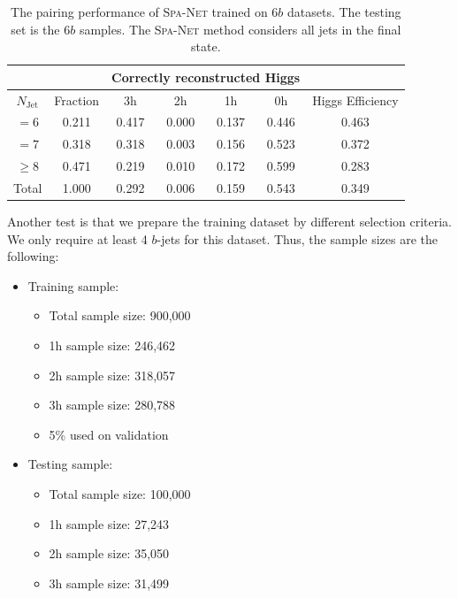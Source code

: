 \documentclass[12pt]{article}
\begin{document}
    \begin{table}[htpb]
		\centering
        \caption{The pairing performance of \textsc{Spa-Net} trained on $6b$ datasets. The testing set is the $6b$ samples. The \textsc{Spa-Net} method considers all jets in the final state.}
		\label{tab:resonant_6b_SPANet_pairing_6b_region}
		\begin{tabular}{c|c|cccc|c}
			\multicolumn{1}{l|}{} &          & \multicolumn{4}{c|}{Correctly reconstructed Higgs} & \multicolumn{1}{l}{} \\ \hline
			$N_\text{Jet}$        & Fraction & 3h          & 2h         & 1h         & 0h         & Higgs Efficiency     \\ \hline
			$=6$                  & 0.211 & 0.417 & 0.000 & 0.137 & 0.446 & 0.463                \\
			$=7$                  & 0.318 & 0.318 & 0.003 & 0.156 & 0.523 & 0.372                \\
			$\ge 8$               & 0.471 & 0.219 & 0.010 & 0.172 & 0.599 & 0.283                \\ \hline
			Total                 & 1.000 & 0.292 & 0.006 & 0.159 & 0.543 & 0.349               
		\end{tabular}
	\end{table}

    Another test is that we prepare the training dataset by different selection criteria. We only require at least 4 $b$-jets for this dataset. Thus, the sample sizes are the following:
    \begin{itemize}
        \item Training sample:
        \begin{itemize}
            \item Total sample size: 900,000
            \item 1h sample size: 246,462
            \item 2h sample size: 318,057
            \item 3h sample size: 280,788
            \item 5\% used on validation
        \end{itemize}
        \item Testing sample:
        \begin{itemize}
            \item Total sample size: 100,000
            \item 1h sample size: 27,243
            \item 2h sample size: 35,050
            \item 3h sample size: 31,499
        \end{itemize}
    \end{itemize}
\end{document}
